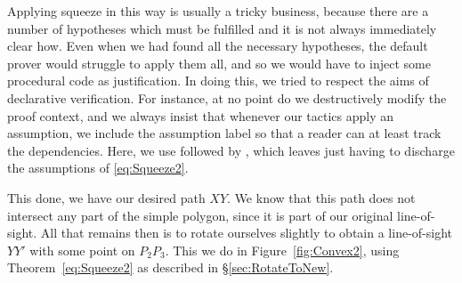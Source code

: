 
\label{sec:InjectingProcedural}Applying squeeze in this way is usually a tricky business, because there are a number of hypotheses which must be fulfilled and it is not always immediately clear how. Even when we had found all the necessary hypotheses, the default  prover would struggle to apply them all, and so we would have to inject some procedural code as justification. In doing this, we tried to respect the aims of declarative verification. For instance, at no point do we destructively modify the proof context, and we always insist that whenever our tactics apply an assumption, we include the assumption label so that a reader can at least track the dependencies. Here, we use  followed by , which leaves  just having to discharge the assumptions of \eqref{eq:Squeeze2}.


\linebreak

This done, we have our desired path $XY$. We know that this path does not intersect any part of the simple polygon, since it is part of our original line-of-sight. All that remains then is to rotate ourselves slightly to obtain a line-of-sight $YY'$ with some point on $P_2P_3$. This we do in Figure~\ref{fig:Convex2}, using Theorem~\ref{eq:Squeeze2} as described in \S\ref{sec:RotateToNew}. 

